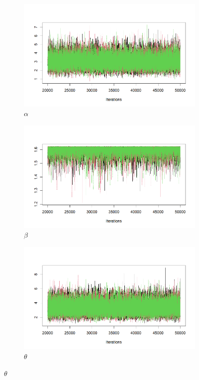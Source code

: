 \documentclass{Class/julia}
\begin{document}
\begin{figure}[!ht]
    \centering
    \begin{subfigure}{0.45\textwidth}
        \centering
        \includegraphics[width=\textwidth]{rytgaard1990/trace_alpha.png}
        \caption{\( \alpha \)}
    \end{subfigure}
    \hfill
    \begin{subfigure}{0.45\textwidth}
        \centering
        \includegraphics[width=\textwidth]{rytgaard1990/trace_beta.png}
        \caption{\( \beta \)}
    \end{subfigure}

    \vspace{1em}

    \begin{subfigure}{0.45\textwidth}
        \centering
        \includegraphics[width=\textwidth]{rytgaard1990/trace_theta.png}
        \caption{\( \theta \)}
    \end{subfigure}


\end{figure}
\end{document}

